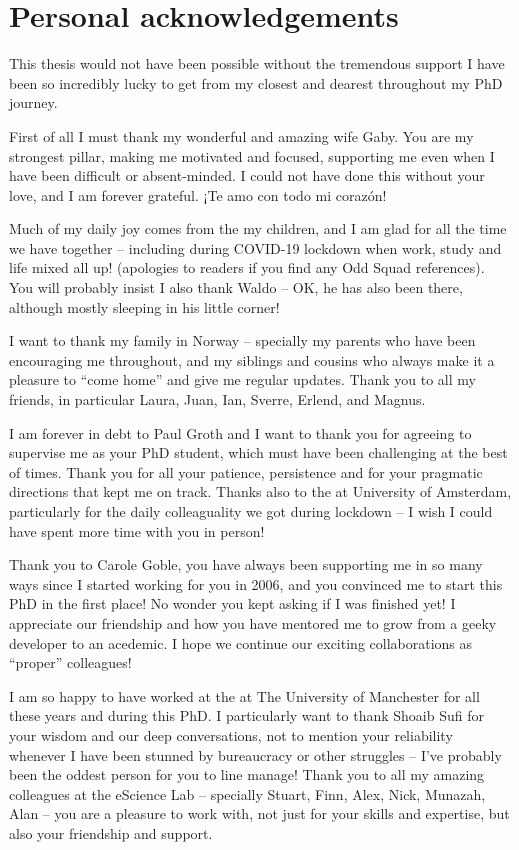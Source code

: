 \label{ch11:acknowledgements}

\section{Personal acknowledgements}\label{personal-acknowledgements}

This thesis would not have been possible without the tremendous support I have been so incredibly lucky to get from my closest and dearest throughout my PhD journey.

First of all I must thank my wonderful and amazing wife Gaby. You are my strongest pillar, making me motivated and focused, supporting me even when I have been difficult or absent-minded. I could not have done this without your love, and I am forever grateful. ¡Te amo con todo mi corazón! 

Much of my daily joy comes from the my children,
and I am glad for all the time we have together -- including during COVID-19 lockdown when work, study and life mixed all up! (apologies to readers if you find any Odd Squad references). You will probably insist I also thank Waldo -- OK, he has also been there, although mostly sleeping in his little corner!

I want to thank my family in Norway -- specially my parents who have been encouraging me throughout, and my siblings and cousins who always make it a pleasure to ``come home'' and give me regular updates.  Thank you to all my friends, in particular Laura, Juan, Ian, Sverre, Erlend, and Magnus. 

I am forever in debt to Paul Groth and I want to thank you for agreeing to supervise me as your PhD student, which must have been challenging at the best of times. Thank you for all your patience, persistence and for your pragmatic directions that kept me on track. Thanks also to the  at University of Amsterdam, particularly for the daily colleaguality we got during lockdown -- I wish I could have spent more time with you in person!

Thank you to Carole Goble, you have always been supporting me in so many ways since I started working for you in 2006, and you convinced me to start this PhD in the first place! No wonder you kept asking if I was finished yet! I appreciate our friendship and how you have mentored me to grow from a geeky developer to an acedemic. I hope we continue our exciting collaborations as ``proper'' colleagues!

I am so happy to have worked at the  at The University of Manchester for all these years and during this PhD. I particularly want to thank Shoaib Sufi for your wisdom and our deep conversations, not to mention your reliability whenever I have been stunned by bureaucracy or other struggles -- I've probably been the oddest person for you to line manage! 
Thank you to all my amazing colleagues at the eScience Lab -- specially Stuart, Finn, Alex, Nick, Munazah, Alan -- you are a pleasure to work with, not just for your skills and expertise, but also your friendship and support.

